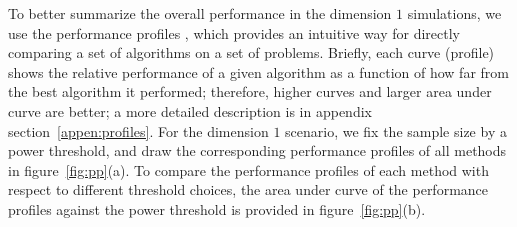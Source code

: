 \documentclass[11pt]{article}
\begin{document}
To better summarize the overall performance in the dimension $1$ simulations, we use the performance profiles \cite{DolanMore2002}, which provides an intuitive way for directly comparing a set of algorithms on a set of problems.  Briefly, each curve (profile) shows the relative performance of a given algorithm as a function of how far from the best algorithm it performed; therefore, higher curves and larger area under curve are better; a more detailed description is in appendix section~\ref{appen:profiles}. For the dimension $1$ scenario, we fix the sample size by a power threshold, and draw the corresponding performance profiles of all methods in figure~\ref{fig:pp}(a). To compare the performance profiles of each method with respect to different threshold choices, the area under curve of the performance profiles against the power threshold is provided in figure~\ref{fig:pp}(b).
\end{document}
